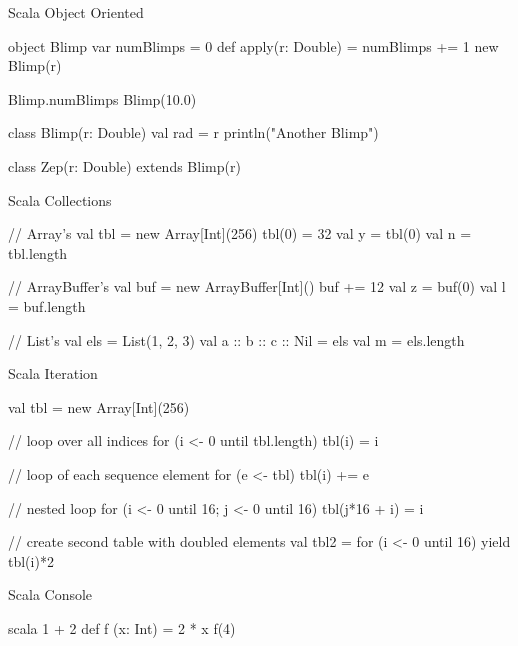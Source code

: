 \documentclass[xcolor=pdflatex,dvipsnames,table]{beamer}
\begin{document}
\begin{frame}[fragile]{Scala Object Oriented}

\begin{scala}
object Blimp {
  var numBlimps = 0
  def apply(r: Double) = {
    numBlimps += 1
    new Blimp(r)
  }
}

Blimp.numBlimps
Blimp(10.0)

class Blimp(r: Double) {
  val rad = r
  println("Another Blimp")
}

class Zep(r: Double) extends Blimp(r)
\end{scala}

\end{frame}

\begin{frame}[fragile]{Scala Collections}
\begin{scala}
// Array's
val tbl = new Array[Int](256)
tbl(0) = 32
val y = tbl(0)
val n = tbl.length

// ArrayBuffer's
val buf = new ArrayBuffer[Int]()
buf += 12
val z = buf(0)
val l = buf.length

// List's
val els = List(1, 2, 3)
val a :: b :: c :: Nil = els
val m = els.length
\end{scala}
\end{frame}

\begin{frame}[fragile]{Scala Iteration}
\begin{scala}
val tbl = new Array[Int](256)

// loop over all indices
for (i <- 0 until tbl.length)
  tbl(i) = i

// loop of each sequence element
for (e <- tbl)
  tbl(i) += e

// nested loop
for (i <- 0 until 16; j <- 0 until 16)
  tbl(j*16 + i) = i

// create second table with doubled elements
val tbl2 = for (i <- 0 until 16) yield tbl(i)*2
\end{scala}
\end{frame}

\begin{frame}[fragile]{Scala Console}
\begin{scala}
scala
1 + 2
def f (x: Int) = 2 * x
f(4)
\end{scala}
\end{frame}
\end{document}
